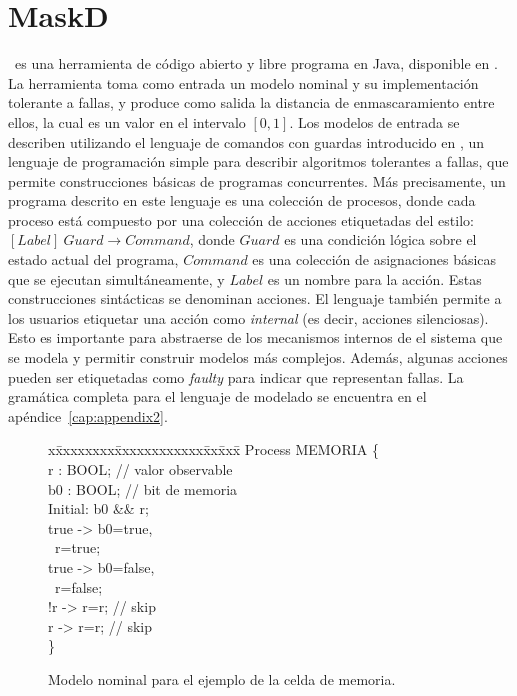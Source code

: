 \section{MaskD} \label{sec:maskD}

\MaskD~es una herramienta de código abierto y libre  programa en \textsf{Java}, disponible en \cite{MaskD}. La herramienta  toma como entrada un modelo nominal y su implementación tolerante a fallas, y produce como salida la distancia de enmascaramiento entre ellos, la cual es un valor en el intervalo $[0,1]$.
Los modelos de entrada se describen utilizando el lenguaje de comandos con guardas introducido en \cite{AroraGouda93}, un lenguaje de programación simple para describir algoritmos tolerantes a fallas, que permite construcciones básicas de programas concurrentes.
Más precisamente, un programa descrito en este lenguaje es una colección de procesos, donde cada proceso está compuesto por una colección de acciones etiquetadas del estilo: $[\mathit{Label}]~\mathit{Guard} \rightarrow \mathit{Command}$, donde $\mathit{Guard}$ es una condición lógica sobre el estado actual del programa, $\mathit{Command}$ es una colección de asignaciones básicas que se ejecutan simultáneamente, y $\mathit{Label}$ es un nombre para la acción.
Estas construcciones sintácticas se denominan acciones. El lenguaje también permite a los usuarios etiquetar una acción como \emph{internal} (es decir, acciones silenciosas). Esto es importante para abstraerse de los mecanismos internos de el sistema que se modela y permitir construir modelos más complejos. Además, algunas acciones pueden ser etiquetadas como \emph{faulty} para indicar que representan fallas. La gramática completa para el lenguaje de modelado se encuentra en el apéndice~\ref{cap:appendix2}.
%
\begin{figure}[t]
\centering
\begin{minipage}[t]{.47\textwidth}
\fontsize{10}{10}\selectfont\ttfamily
\begin{tabbing}
x\=xxxxxxxx\=xxxxxxxxxxxx\=xx\=xxx\= \kill    
Process MEMORIA \{\\[1ex]
\>r : BOOL;  // valor observable \\ 
\>b0 : BOOL; // bit de memoria\\[1ex]
\>Initial: b0 \&\& r;\\[1ex]
\>[write1]  true -> b0=true, \\
\>\>~r=true; \\
\>[write0]  true -> b0=false, \\
\>\>~r=false; \\
\>[read0] !r -> r=r; // skip \\
\>[read1]  r -> r=r; // skip \\[1ex]
\}\\
\end{tabbing}
\end{minipage}
\caption{Modelo nominal para el ejemplo de la celda de memoria.} \label{fig:exam_1_mem_cell_nominal}
\end{figure}

